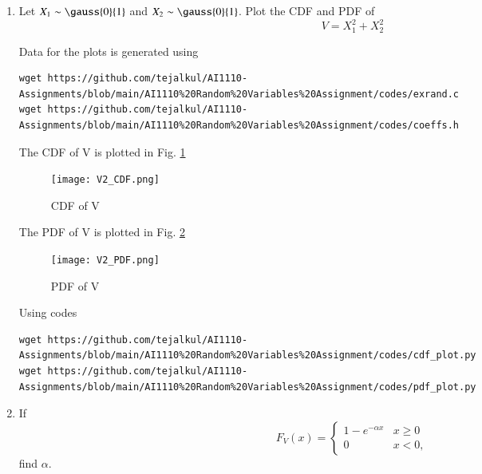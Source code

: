 \documentclass[journal,12pt,twocolumn]{IEEEtran}
\renewcommand\thesection{\arabic{section}}
\begin{document}
\begin{enumerate}[label=\thesection.\arabic*
,ref=\thesection.\theenumi]
\item
Let $X_1 \sim  \gauss{0}{1}$ and $X_2 \sim  \gauss{0}{1}$. Plot the CDF and PDF of
%
\begin{equation}
V = X_1^2 + X_2^2
\end{equation}

\solution
Data for the plots is generated using
\begin{lstlisting}
wget https://github.com/tejalkul/AI1110-Assignments/blob/main/AI1110%20Random%20Variables%20Assignment/codes/exrand.c
wget https://github.com/tejalkul/AI1110-Assignments/blob/main/AI1110%20Random%20Variables%20Assignment/codes/coeffs.h
\end{lstlisting}
The CDF of V is plotted in Fig. \ref{Fig:chi_cdf} 
\begin{figure}[!ht]
\texttt{[image: V2\_CDF.png]}
\caption{CDF of V}
\label{Fig:chi_cdf}
\end{figure}

The PDF of V is plotted in Fig. \ref{Fig:chi_pdf} 

\begin{figure}[!ht]
\texttt{[image: V2\_PDF.png]}
\caption{PDF of V}
\label{Fig:chi_pdf}
\end{figure} 

Using codes
\begin{lstlisting}
wget https://github.com/tejalkul/AI1110-Assignments/blob/main/AI1110%20Random%20Variables%20Assignment/codes/cdf_plot.py
wget https://github.com/tejalkul/AI1110-Assignments/blob/main/AI1110%20Random%20Variables%20Assignment/codes/pdf_plot.py
\end{lstlisting}
%
%
%
\item
If
%
\begin{equation}
F_{V}(x) = 
\begin{cases}
1 - e^{-\alpha x} & x \geq 0 \\
0 & x < 0,
\end{cases}
\end{equation}
%
find $\alpha$.
%


\end{enumerate}
\end{document}
